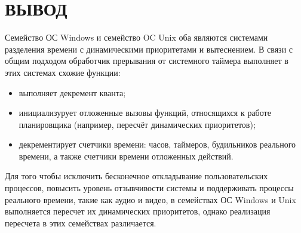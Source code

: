 \section*{ВЫВОД}

Семейство ОС Windows и семейство OC Unix оба являются системами разделения времени с динамическими приоритетами и вытеснением. В связи с общим подходом обработчик прерывания от системного таймера выполняет в этих системах схожие функции: 

\begin{itemize}[label=---]
	\item выполняет декремент кванта;
	\item инициализурует отложенные вызовы функций, относящихся к работе планировщика (например, пересчёт динамических приоритетов);
	\item декрементирует счетчики времени: часов, таймеров, будильников реального времени, а также счетчики времени отложенных действий.
\end{itemize}

Для того чтобы исключить бесконечное откладывание пользовательских процессов, повысить уровень отзывчивости системы и поддерживать процессы реального времени, такие как аудио и видео, в семействах ОС Windows и Unix выполняется пересчет их динамических приоритетов, однако реализация пересчета в этих семействах различается. 


